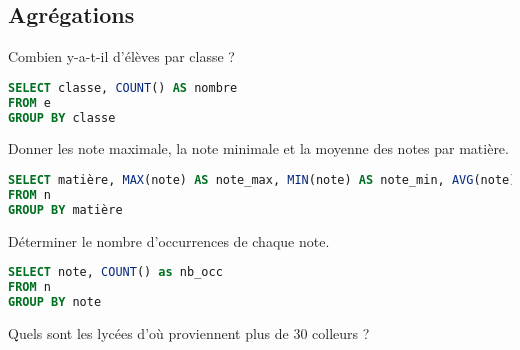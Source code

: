 \subsection{Agrégations} 
\begin{Exercise}
Combien y-a-t-il d'élèves par classe ?
\end{Exercise}
\begin{Answer}
\begin{lstlisting}[language=SQL]
SELECT classe, COUNT() AS nombre
FROM e
GROUP BY classe
\end{lstlisting}
\end{Answer}
\begin{Exercise}
Donner les note maximale, la note minimale et la moyenne des notes par matière.
\end{Exercise}
\begin{Answer}
\begin{lstlisting}[language=SQL]
SELECT matière, MAX(note) AS note_max, MIN(note) AS note_min, AVG(note) AS note_moyenne
FROM n
GROUP BY matière
\end{lstlisting}
\end{Answer}
\begin{Exercise}
Déterminer le nombre d’occurrences de chaque note.
\end{Exercise}
\begin{Answer}
\begin{lstlisting}[language=SQL]
SELECT note, COUNT() as nb_occ
FROM n
GROUP BY note
\end{lstlisting}
\end{Answer}
\begin{Exercise}
Quels sont les lycées d'où proviennent plus de 30 colleurs ?
\end{Exercise}
